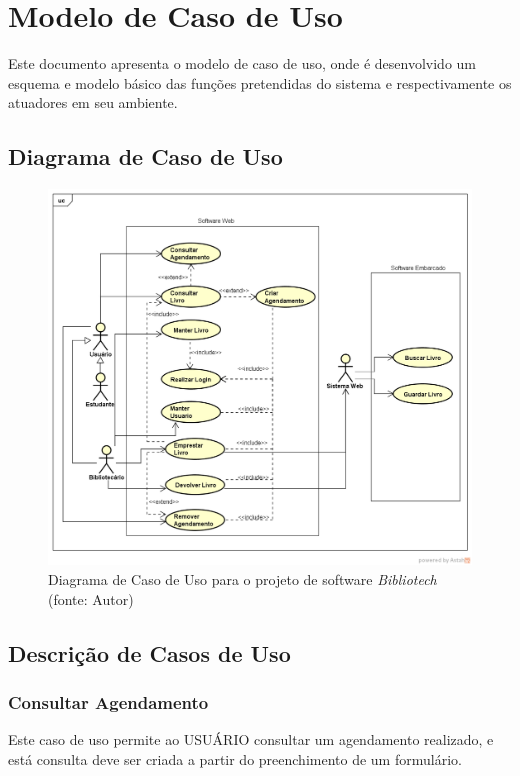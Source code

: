 \chapter[Modelo de Caso de Uso]{Modelo de Caso de Uso}
Este documento apresenta o modelo de caso de uso, onde é desenvolvido um esquema e modelo básico das funções pretendidas do sistema e respectivamente os atuadores em seu ambiente. 

\section{Diagrama de Caso de Uso}
\begin{figure}[!h]
\centering
\includegraphics[scale=0.50, angle = 360]{figuras/caso_uso}
\caption[]{Diagrama de Caso de Uso para o projeto de software \textit{Bibliotech} (fonte: Autor)
}
\end{figure}
\FloatBarrier

\section{Descrição de Casos de Uso}

\subsection{Consultar Agendamento}
Este caso de uso permite ao USUÁRIO consultar um agendamento realizado, e está consulta deve ser criada a partir do preenchimento de um formulário.

